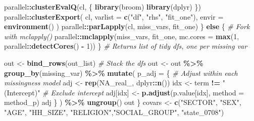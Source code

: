 \documentclass[
]{article}
\newenvironment{Shaded}{\begin{snugshade}}{\end{snugshade}}
\newcommand{\AttributeTok}[1]{\textcolor[rgb]{0.13,0.29,0.53}{#1}}
\newcommand{\CommentTok}[1]{\textcolor[rgb]{0.56,0.35,0.01}{\textit{#1}}}
\newcommand{\ConstantTok}[1]{\textcolor[rgb]{0.56,0.35,0.01}{#1}}
\newcommand{\ControlFlowTok}[1]{\textcolor[rgb]{0.13,0.29,0.53}{\textbf{#1}}}
\newcommand{\DecValTok}[1]{\textcolor[rgb]{0.00,0.00,0.81}{#1}}
\newcommand{\FunctionTok}[1]{\textcolor[rgb]{0.13,0.29,0.53}{\textbf{#1}}}
\newcommand{\NormalTok}[1]{#1}
\newcommand{\OtherTok}[1]{\textcolor[rgb]{0.56,0.35,0.01}{#1}}
\newcommand{\SpecialCharTok}[1]{\textcolor[rgb]{0.81,0.36,0.00}{\textbf{#1}}}
\newcommand{\StringTok}[1]{\textcolor[rgb]{0.31,0.60,0.02}{#1}}
\begin{document}
\begin{Shaded}
\begin{Highlighting}[]
\NormalTok{  parallel}\SpecialCharTok{::}\FunctionTok{clusterEvalQ}\NormalTok{(cl, \{}
    \FunctionTok{library}\NormalTok{(broom)}
    \FunctionTok{library}\NormalTok{(dplyr)}
\NormalTok{  \})}
\NormalTok{  parallel}\SpecialCharTok{::}\FunctionTok{clusterExport}\NormalTok{(}
\NormalTok{    cl,}
    \AttributeTok{varlist =} \FunctionTok{c}\NormalTok{(}\StringTok{"df"}\NormalTok{, }\StringTok{"rhs"}\NormalTok{, }\StringTok{"fit\_one"}\NormalTok{),}
    \AttributeTok{envir =} \FunctionTok{environment}\NormalTok{()}
\NormalTok{  )}
\NormalTok{  parallel}\SpecialCharTok{::}\FunctionTok{parLapply}\NormalTok{(cl, miss\_vars, fit\_one)}
\NormalTok{  \} }\ControlFlowTok{else}\NormalTok{ \{ }\CommentTok{\# Fork with mclapply()}
\NormalTok{    parallel}\SpecialCharTok{::}\FunctionTok{mclapply}\NormalTok{(miss\_vars, fit\_one, }\AttributeTok{mc.cores =} \FunctionTok{max}\NormalTok{(}\DecValTok{1}\NormalTok{, parallel}\SpecialCharTok{::}\FunctionTok{detectCores}\NormalTok{() }\SpecialCharTok{{-}} \DecValTok{1}\NormalTok{))}
\NormalTok{  \} }\CommentTok{\# Returns list of tidy dfs, one per missing var}
  
\NormalTok{  out }\OtherTok{\textless{}{-}} \FunctionTok{bind\_rows}\NormalTok{(out\_list) }\CommentTok{\# Stack the dfs}
\NormalTok{  out }\OtherTok{\textless{}{-}}\NormalTok{ out }\SpecialCharTok{\%\textgreater{}\%}
    \FunctionTok{group\_by}\NormalTok{(missing\_var) }\SpecialCharTok{\%\textgreater{}\%}
    \FunctionTok{mutate}\NormalTok{(}
      \AttributeTok{p\_adj =}\NormalTok{ \{ }\CommentTok{\# Adjust within each missingness model}
\NormalTok{        adj }\OtherTok{\textless{}{-}} \FunctionTok{rep}\NormalTok{(}\ConstantTok{NA\_real\_}\NormalTok{, dplyr}\SpecialCharTok{::}\FunctionTok{n}\NormalTok{())}
\NormalTok{        idx }\OtherTok{\textless{}{-}}\NormalTok{ term }\SpecialCharTok{!=} \StringTok{"(Intercept)"} \CommentTok{\# Exclude intercept}
\NormalTok{        adj[idx] }\OtherTok{\textless{}{-}} \FunctionTok{p.adjust}\NormalTok{(p.value[idx], }\AttributeTok{method =}\NormalTok{ method\_p)}
\NormalTok{        adj}
\NormalTok{      \}}
\NormalTok{      ) }\SpecialCharTok{\%\textgreater{}\%} 
    \FunctionTok{ungroup}\NormalTok{() }
\NormalTok{  out}
\NormalTok{\}}
\NormalTok{covars }\OtherTok{\textless{}{-}} \FunctionTok{c}\NormalTok{(}\StringTok{"SECTOR"}\NormalTok{, }\StringTok{"SEX"}\NormalTok{, }\StringTok{"AGE"}\NormalTok{, }\StringTok{"HH\_SIZE"}\NormalTok{, }\StringTok{"RELIGION"}\NormalTok{,}\StringTok{"SOCIAL\_GROUP"}\NormalTok{, }\StringTok{"state\_0708"}\NormalTok{)}


\end{Highlighting}
\end{Shaded}
\end{document}
